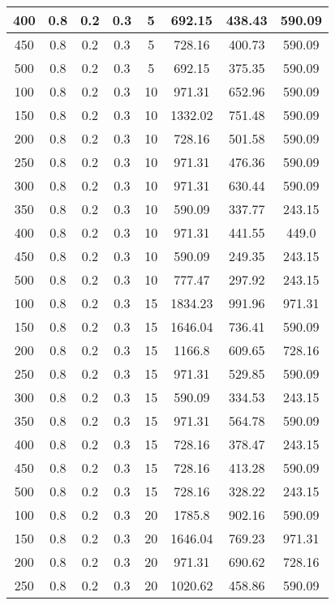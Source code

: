 \documentclass[a4paper, 12pt]{extreport}
\begin{document}
\begin{itemize}
\begin{longtable}{|c|c|c|c|c|c|c|c|}
			400 & 0.8 & 0.2 & 0.3 & 5 & 692.15 & 438.43 & 590.09 \\\hline
			450 & 0.8 & 0.2 & 0.3 & 5 & 728.16 & 400.73 & 590.09 \\\hline
			500 & 0.8 & 0.2 & 0.3 & 5 & 692.15 & 375.35 & 590.09 \\\hline
			100 & 0.8 & 0.2 & 0.3 & 10 & 971.31 & 652.96 & 590.09 \\\hline
			150 & 0.8 & 0.2 & 0.3 & 10 & 1332.02 & 751.48 & 590.09 \\\hline
			200 & 0.8 & 0.2 & 0.3 & 10 & 728.16 & 501.58 & 590.09 \\\hline
			250 & 0.8 & 0.2 & 0.3 & 10 & 971.31 & 476.36 & 590.09 \\\hline
			300 & 0.8 & 0.2 & 0.3 & 10 & 971.31 & 630.44 & 590.09 \\\hline
			350 & 0.8 & 0.2 & 0.3 & 10 & 590.09 & 337.77 & 243.15 \\\hline
			400 & 0.8 & 0.2 & 0.3 & 10 & 971.31 & 441.55 & 449.0 \\\hline
			450 & 0.8 & 0.2 & 0.3 & 10 & 590.09 & 249.35 & 243.15 \\\hline
			500 & 0.8 & 0.2 & 0.3 & 10 & 777.47 & 297.92 & 243.15 \\\hline
			100 & 0.8 & 0.2 & 0.3 & 15 & 1834.23 & 991.96 & 971.31 \\\hline
			150 & 0.8 & 0.2 & 0.3 & 15 & 1646.04 & 736.41 & 590.09 \\\hline
			200 & 0.8 & 0.2 & 0.3 & 15 & 1166.8 & 609.65 & 728.16 \\\hline
			250 & 0.8 & 0.2 & 0.3 & 15 & 971.31 & 529.85 & 590.09 \\\hline
			300 & 0.8 & 0.2 & 0.3 & 15 & 590.09 & 334.53 & 243.15 \\\hline
			350 & 0.8 & 0.2 & 0.3 & 15 & 971.31 & 564.78 & 590.09 \\\hline
			400 & 0.8 & 0.2 & 0.3 & 15 & 728.16 & 378.47 & 243.15 \\\hline
			450 & 0.8 & 0.2 & 0.3 & 15 & 728.16 & 413.28 & 590.09 \\\hline
			500 & 0.8 & 0.2 & 0.3 & 15 & 728.16 & 328.22 & 243.15 \\\hline
			100 & 0.8 & 0.2 & 0.3 & 20 & 1785.8 & 902.16 & 590.09 \\\hline
			150 & 0.8 & 0.2 & 0.3 & 20 & 1646.04 & 769.23 & 971.31 \\\hline
			200 & 0.8 & 0.2 & 0.3 & 20 & 971.31 & 690.62 & 728.16 \\\hline
			250 & 0.8 & 0.2 & 0.3 & 20 & 1020.62 & 458.86 & 590.09 \\\hline

\end{longtable}
\end{itemize}
\end{document}
